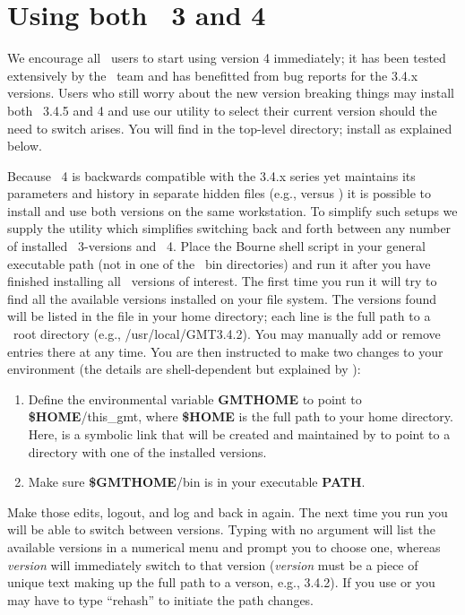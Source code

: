 %
%

\chapter{Using both \gmt\ 3 and 4}
\thispagestyle{headings}

We encourage all \GMT\ users to start using version 4 immediately; it has been tested extensively by
the \GMT\ team and has benefitted from bug reports for the 3.4.x versions.  Users who still worry about the
new version breaking things may install both \GMT\ 3.4.5 and 4 and use our utility 
to select their current version should the need to switch arises.  You will find 
in the top-level  directory; install as explained below.

Because \GMT\ 4 is backwards compatible with the 3.4.x series yet maintains its parameters
and history in separate hidden files (e.g.,  versus )
it is possible to install and use both versions on the same workstation.  To simplify such
setups we supply the utility  which simplifies switching back and forth
between any number of installed \GMT\ 3-versions and \GMT\ 4.  Place the  Bourne shell script in your
general executable path (not in one of the \GMT\ bin directories) and run it after you have
finished installing all \GMT\ versions of interest.  The first time you run 
it will try to find all the available versions installed on your file system.  The versions
found will be listed in the file  in your home directory; each line
is the full path to a \GMT\ root directory (e.g., /usr/local/GMT3.4.2).  You may
manually add or remove entries there at any time.  You are then instructed to make two
changes to your environment (the details are shell-dependent but explained by ):
\begin{enumerate}
\item Define the environmental variable {\bf GMTHOME} to point to {\bf \$HOME}/this\_gmt,
where {\bf \$HOME} is the full path to your home directory.
Here,  is a symbolic link that will be created and maintained by 
to point to a directory with one of the installed versions. 
\item Make sure {\bf \$GMTHOME}/bin is in your executable {\bf PATH}.
\end{enumerate}
Make those edits, logout, and log and back in again.  The next time you run 
you will be able to switch between versions.  Typing  with no argument will list the
available versions in a numerical menu and prompt you to choose one, whereas  {\it version}
will immediately switch to that version ({\it version} must be a piece of unique text making
up the full path to a verson, e.g., 3.4.2).  If you use  or  you may have to type
``rehash'' to initiate the path changes.
